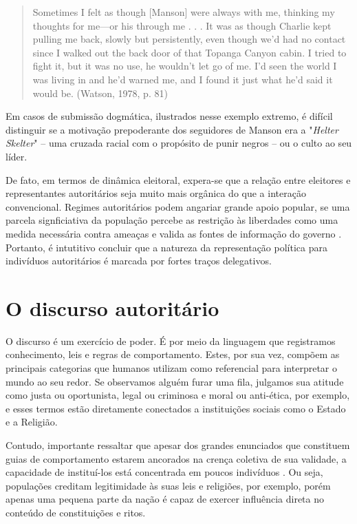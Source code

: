 \documentclass[
12pt,				%
openright,			%
twoside,			%
a4paper,			%
english,			%
french,				%
spanish,			%
brazil				%
]{abntex2}
\begin{document}
\begin{quote}
	Sometimes I felt as though [Manson] were always with me, thinking my
	thoughts for me—or his through me . . . It was as though Charlie kept
	pulling me back, slowly but persistently, even though we’d had no contact
	since I walked out the back door of that Topanga Canyon cabin. I tried to
	fight it, but it was no use, he wouldn’t let go of me. I’d seen the world I was
	living in and he’d warned me, and I found it just what he’d said it would be. (Watson, 1978, p. 81)
\end{quote}

Em casos de submissão dogmática, ilustrados nesse exemplo extremo, é difícil distinguir se a motivação prepoderante dos seguidores de Manson era a "\emph{Helter Skelter}" -- uma cruzada racial com o propósito de punir negros -- ou o culto ao seu líder.

De fato, em termos de dinâmica eleitoral, expera-se que a relação entre eleitores e representantes autoritários seja muito mais orgânica do que a interação convencional. Regimes autoritários podem angariar grande apoio popular, se uma parcela signficiativa da população percebe as restrição às liberdades como uma medida necessária contra ameaças e valida as fontes de informação do governo \cite{geddes1989sources, stein2013unraveling}. Portanto, é intutitivo concluir que a natureza da representação política para indivíduos autoritários é marcada por fortes traços delegativos.

\section{O discurso autoritário}

O discurso é um exercício de poder. É por meio da linguagem que registramos conhecimento, leis e regras de comportamento. Estes, por sua vez, compõem as principais categorias que humanos utilizam como referencial para interpretar o mundo ao seu redor. Se observamos alguém furar uma fila, julgamos sua atitude como justa ou oportunista, legal ou criminosa e moral ou anti-ética, por exemplo, e esses termos estão diretamente conectados a instituições sociais como o Estado e a Religião. 

Contudo, importante ressaltar que apesar dos grandes enunciados que constituem guias de comportamento estarem ancorados na crença coletiva de sua validade, a capacidade de instituí-los está concentrada em poucos indivíduos \cite{foucault1969archeologie}. Ou seja, populações creditam legitimidade às suas leis e religiões, por exemplo, porém apenas uma pequena parte da nação é capaz de exercer influência direta no conteúdo de constituições e ritos.
\end{document}
